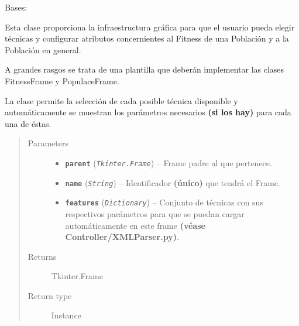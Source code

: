 \documentclass[letterpaper,10pt,english]{sphinxmanual}
\begin{document}
\begin{fulllineitems}
\label{View/Main/Population/TemplatePopulation/TemplatePopulationFrame:View.Main.Population.TemplatePopulation.TemplatePopulationFrame.TemplatePopulationFrame}
Bases: 

\begin{DUlineblock}{0em}
\item[] Esta clase proporciona la infraestructura gráfica para que el usuario pueda 
elegir técnicas y configurar atributos concernientes al Fitness de una Población
y a la Población en general.
\item[] A grandes rasgos se trata de una plantilla que deberán implementar las clases
FitnessFrame y PopulaceFrame.
\item[] La clase permite la selección de cada posible técnica disponible y automáticamente 
se muestran los parámetros necesarios \textbf{(si los hay)} para cada una de éstas.
\end{DUlineblock}
\begin{quote}\begin{description}
\item[{Parameters}] \leavevmode\begin{itemize}
\item {} 
\textbf{\texttt{parent}} (\emph{\texttt{Tkinter.Frame}}) -- Frame padre al que pertenece.

\item {} 
\textbf{\texttt{name}} (\emph{\texttt{String}}) -- Identificador \textbf{(único)} que tendrá el Frame.

\item {} 
\textbf{\texttt{features}} (\emph{\texttt{Dictionary}}) -- Conjunto de técnicas con sus respectivos parámetros para que
se puedan cargar automáticamente en este frame \textbf{(véase
Controller/XMLParser.py)}.

\end{itemize}

\item[{Returns}] \leavevmode
Tkinter.Frame

\item[{Return type}] \leavevmode
Instance

\end{description}\end{quote}


\end{fulllineitems}
\end{document}
